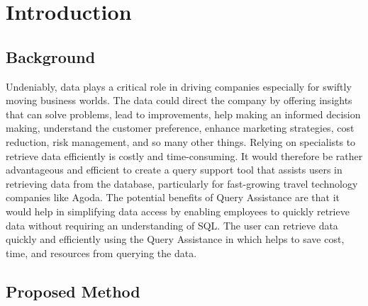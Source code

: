 \chapter{Introduction}



\section{Background} 

Undeniably, data plays a critical role in driving companies especially for swiftly moving business worlds. The data could direct the company by offering insights that can solve problems, lead to improvements, help making an informed decision making, understand the customer preference, enhance marketing strategies, cost reduction, risk management, and so many other things. Relying on specialists to retrieve data efficiently is costly and time-consuming. It would therefore be rather advantageous and efficient to create a query support tool that assists users in retrieving data from the database, particularly for fast-growing travel technology companies like Agoda.
The potential benefits of Query Assistance are that it would help in simplifying data access by enabling employees to quickly retrieve data without requiring an understanding of SQL. The user can retrieve data quickly and efficiently using the Query Assistance in which helps to save cost, time, and resources from querying the data.

\section{Proposed Method}
